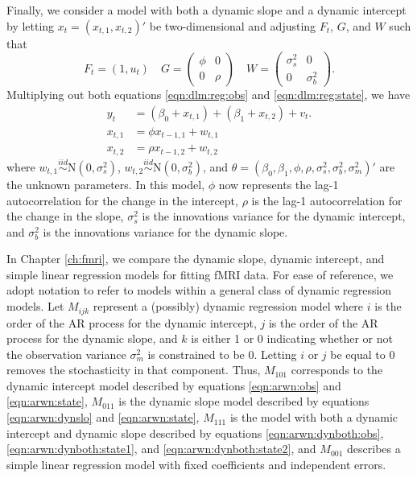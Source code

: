 Finally, we consider a model with both a dynamic slope and a dynamic intercept by letting $x_t = (x_{t,1},x_{t,2})'$ be two-dimensional and adjusting $F_t$, $G$, and $W$ such that
\begin{equation}
F_t = (1, u_t) \quad G = \left(\begin{array}{cc} \phi & 0 \\ 0 & \rho \end{array}\right) \quad W = \left(\begin{array}{cc} \sigma^2_s & 0 \\ 0 & \sigma^2_b \end{array}\right). \label{eqn:arwn:dynboth:def}
\end{equation}
Multiplying out both equations \eqref{eqn:dlm:reg:obs} and \eqref{eqn:dlm:reg:state}, we have
\begin{align}
y_t &= (\beta_0 + x_{t,1}) + (\beta_1 + x_{t,2}) + v_t. \label{eqn:arwn:dynboth:obs} \\
x_{t,1} &= \phi x_{t-1,1} + w_{t,1} \label{eqn:arwn:dynboth:state1} \\
x_{t,2} &= \rho x_{t-1,2} + w_{t,2} \label{eqn:arwn:dynboth:state2}
\end{align}
where $w_{t,1} \stackrel{iid}{\sim} \mbox{N}(0,\sigma^2_s)$, $w_{t,2} \stackrel{iid}{\sim} \mbox{N}(0,\sigma^2_b)$, and $\theta = (\beta_0,\beta_1,\phi,\rho,\sigma^2_s,\sigma^2_b,\sigma^2_m)'$ are the unknown parameters. In this model, $\phi$ now represents the lag-1 autocorrelation for the change in the intercept, $\rho$ is the lag-1 autocorrelation for the change in the slope, $\sigma^2_s$ is the innovations variance for the dynamic intercept, and $\sigma^2_b$ is the innovations variance for the dynamic slope.

In Chapter \ref{ch:fmri}, we compare the dynamic slope, dynamic intercept, and simple linear regression models for fitting fMRI data. For ease of reference, we adopt notation to refer to models within a general class of dynamic regression models. Let $M_{ijk}$ represent a (possibly) dynamic regression model where $i$ is the order of the AR process for the dynamic intercept, $j$ is the order of the AR process for the dynamic slope, and $k$ is either 1 or 0 indicating whether or not the observation variance $\sigma^2_m$ is constrained to be 0. Letting $i$ or $j$ be equal to 0 removes the stochasticity in that component. Thus, $M_{101}$ corresponds to the dynamic intercept model described by equations \ref{eqn:arwn:obs} and \ref{eqn:arwn:state}, $M_{011}$ is the dynamic slope model described by equations \ref{eqn:arwn:dynslo} and \ref{eqn:arwn:state}, $M_{111}$ is the model with both a dynamic intercept and dynamic slope described by equations \ref{eqn:arwn:dynboth:obs}, \ref{eqn:arwn:dynboth:state1}, and \ref{eqn:arwn:dynboth:state2}, and $M_{001}$ describes a simple linear regression model with fixed coefficients and independent errors.

